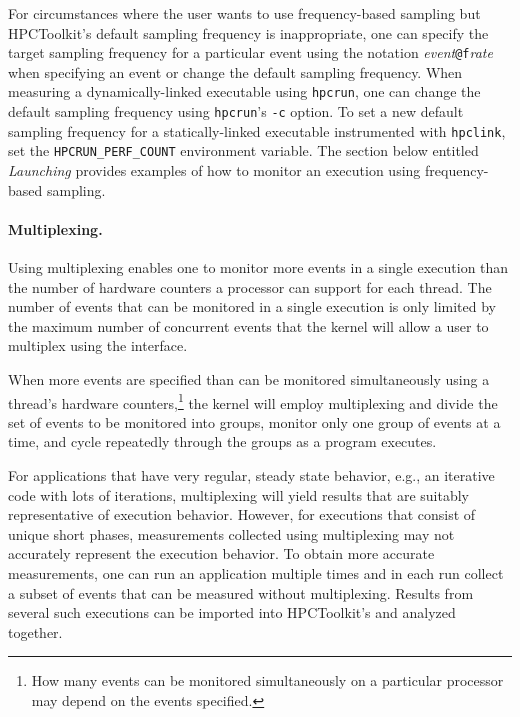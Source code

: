 For circumstances where the user wants to use frequency-based sampling but 
HPCToolkit's default sampling frequency is inappropriate, 
one can specify the target sampling frequency for a particular event using the notation 
{\em event}{\tt @f}{\em rate} when specifying an event or change the default sampling frequency.
When measuring a dynamically-linked executable using {\tt hpcrun}, one can change the default sampling frequency using {\tt hpcrun}'s {\tt -c} option. To set a new default sampling frequency for a statically-linked executable instrumented with {\tt hpclink}, set the \verb|HPCRUN_PERF_COUNT| environment variable.
The section below entitled {\em Launching} provides  
examples of how to monitor an execution using frequency-based sampling.

\paragraph{Multiplexing.} 
Using multiplexing enables one to monitor more events
in a single execution than the number of hardware counters a processor
can support for each thread. The number of events that can be monitored in
a single execution is only limited by the maximum number of concurrent
events that the kernel will allow a user to multiplex using the
\perfevents{} interface.

When more events are specified than can be monitored simultaneously
using a thread's hardware counters,\footnote{How many events can be
  monitored simultaneously on a particular processor may depend on the
  events specified.} the kernel will employ multiplexing and divide
the set of events to be monitored into groups, monitor only one group
of events at a time, and cycle repeatedly through the groups
as a program executes. 

For applications that have very regular,
steady state behavior, e.g., an iterative code with lots of
iterations, multiplexing will yield results that are suitably representative
of execution behavior.  However, for executions that consist of
unique short phases, measurements collected using multiplexing may
not accurately represent the execution behavior. To obtain
more accurate measurements, one can run an application multiple times and in 
each run collect a subset of events that can be measured without multiplexing.
Results from several such executions can be imported into HPCToolkit's \hpcviewer{} 
and analyzed together.


